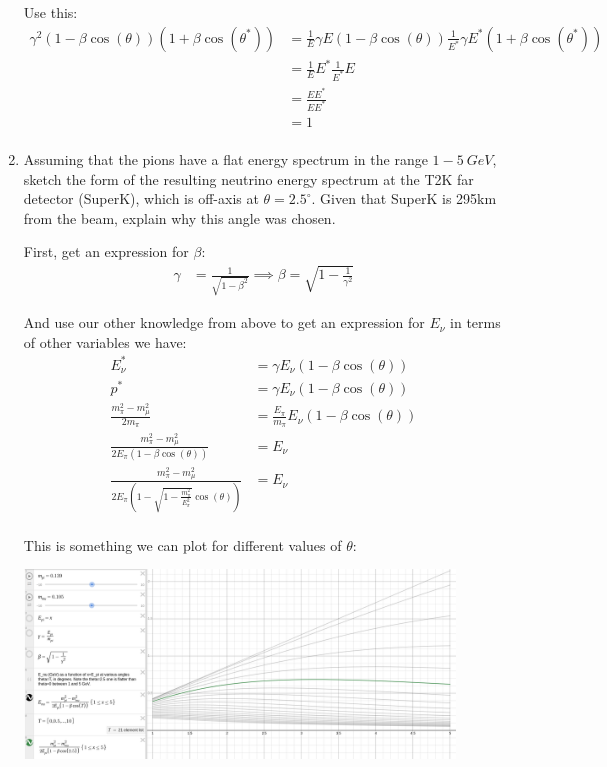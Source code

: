 \begin{enumerate}[label=\textbf{\alph*}.]
    Use this:
    \begin{align*}
        \gamma^2 (1 - \beta\cos(\theta))(1 + \beta\cos(\theta^*)) &= \frac{1}{E}\gamma E(1 - \beta\cos(\theta)) \frac{1}{E^*}\gamma E^*(1 + \beta \cos(\theta^*))\\
        &= \frac{1}{E}E^* \frac{1}{E^*}E\\
        &= \frac{EE^*}{EE^*}\\
        &= 1\\
    \end{align*}

    \item Assuming that the pions have a flat energy spectrum in the range $1-\SI{5}{GeV}$, sketch the form of the resulting neutrino energy spectrum at the T2K far detector (SuperK), which is off-axis at $\theta=2.5^\circ$. Given that SuperK is 295km from the beam, explain why this angle was chosen.

    First, get an expression for $\beta$:
    \begin{align*}
        \gamma &= \frac{1}{\sqrt{1 - \beta^2}}
        \implies \beta = \sqrt{1 - \frac{1}{\gamma^2}}
    \end{align*}

    And use our other knowledge from above to get an expression for $E_\nu$ in terms of other variables we have:
    \begin{align*}
        E_\nu^* &= \gamma E_\nu(1 - \beta \cos(\theta)) \\
        p^* &= \gamma E_\nu(1 - \beta \cos(\theta)) \\
        \frac{m_\pi^2 - m_\mu^2}{2m_\pi} &= \frac{E_\pi}{m_\pi} E_\nu(1 - \beta \cos(\theta)) \\
        \frac{m_\pi^2 - m_\mu^2}{2E_\pi(1 - \beta \cos(\theta))} &= E_\nu \\
        \frac{m_\pi^2 - m_\mu^2}{2E_\pi\left(1 - \sqrt{1 - \frac{m_\pi^2}{E_\pi^2}} \cos(\theta)\right)} &= E_\nu \\
    \end{align*}

    \newpage
    This is something we can plot for different values of $\theta$:
    \begin{center}
        \includegraphics[width=0.9\textwidth]{q5.png}


\end{center}
\end{enumerate}
